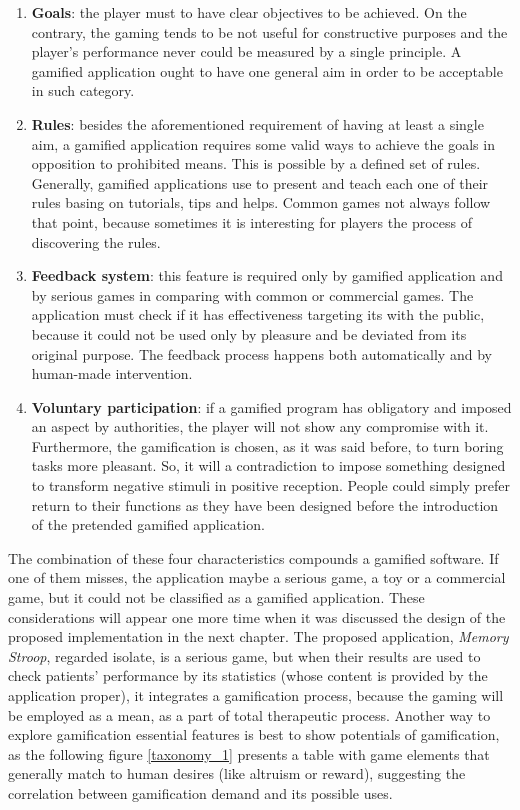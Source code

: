 \begin{enumerate}
	\item  \textbf{Goals}: the player must to have clear objectives to be achieved. On the contrary, the gaming tends to be not useful for constructive purposes and the player's performance never could be measured by a single principle. A gamified application ought to have one general aim in order to be acceptable in such category.
	\item \textbf{Rules}: besides the aforementioned requirement of having at least a single aim, a gamified application requires some valid ways to achieve the goals in opposition to prohibited means. This is possible by a defined set of rules. Generally, gamified applications use to present and teach each one of their rules basing on tutorials, tips and helps. Common games not always follow that point, because sometimes it is interesting for players the process of discovering the rules.
	\item \textbf{Feedback system}: this feature is required only by gamified  application and by serious games in comparing with common or commercial games. The application must check if it has effectiveness targeting its with the public, because it could not be used only by pleasure and be deviated from its original purpose. The feedback process happens both  automatically and by human-made intervention.
	\item \textbf{Voluntary participation}: if a gamified program has obligatory and imposed an aspect  by authorities, the player will not show any compromise with it. Furthermore, the gamification is chosen, as it was said before, to turn boring tasks more pleasant. So, it will a contradiction to impose something designed to transform negative stimuli in positive reception. People could simply prefer return to their functions as they have been designed before the introduction of the pretended gamified application.
\end{enumerate}

The combination of these four characteristics compounds a gamified software. If one of them misses, the application maybe a serious game, a toy or a commercial game, but it could not be classified as a gamified application. These considerations will appear one more time when it was discussed the design of the proposed implementation in the next chapter. The proposed application, \textit{Memory Stroop}, regarded isolate, is a serious game, but when their results are used to check patients' performance by its statistics (whose content is provided by the application proper), it integrates a gamification process, because the gaming will be employed as a mean, as a part of total therapeutic process. Another way to explore gamification essential features is best to show potentials of gamification, as the following figure \ref{taxonomy_1} presents a table with game elements that generally match to human desires (like altruism or reward), suggesting the correlation between gamification demand and its possible uses. 

